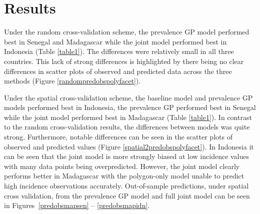\documentclass{statsoc}
\begin{document}
\begin{table}
\caption{\label{table1}
Summary of out-of-sample accuracy for all cross-validation experiments. 
Mean absolute error of predicted incidence rate against out-of-sample observed data for three countries.}
\centering
{}
\end{table}



\section*{Results}


Under the random cross-validation scheme, the prevalence GP model performed best in Senegal and Madagascar while the joint model performed best in Indonesia (Table \ref{table1}).
The differences were relatively small in all three countries.
This lack of strong differences is highlighted by there being no clear differences in scatter plots of observed and predicted data across the three methods (Figure \ref{randompredobspolyfacet}).




Under the spatial cross-validation scheme, the baseline model and prevalence GP models performed best in Indonesia, the prevalence GP performed best in Senegal while the joint model performed best in Madagascar (Table \ref{table1}).
In contrast to the random cross-validation results, the differences between models was quite strong.
Furthermore, notable differences can be seen in the scatter plots of observed and predicted values (Figure \ref{spatial2predobspolyfacet}).
In Indonesia it can be seen that the joint model is more strongly biased at low incidence values with many data points being overpredicted.
However, the joint model clearly performs better in Madagascar with the polygon-only model unable to predict high incidence observations accurately.
Out-of-sample predictions, under spatial cross validation, from the prevalence GP model and full joint model can be seen in Figures~\ref{predobsmapsen} -- \ref{predobsmapidn}.
\end{document}
